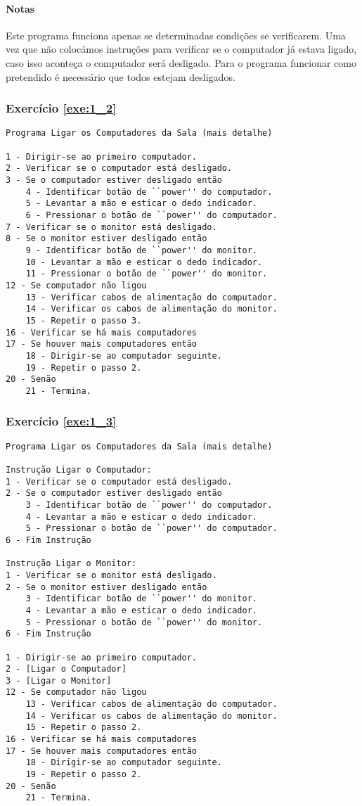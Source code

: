 \paragraph{Notas}
Este programa funciona apenas se determinadas condições se verificarem. Uma vez que 
não colocámos instruções para verificar se o computador já estava ligado, caso
isso aconteça o computador será desligado. Para o programa funcionar como
pretendido é necessário que todos estejam desligados.


\subsubsection*{Exercício \ref{exe:1_2}}
{\footnotesize
\begin{verbatim}
Programa Ligar os Computadores da Sala (mais detalhe)

1 - Dirigir-se ao primeiro computador.
2 - Verificar se o computador está desligado.
3 - Se o computador estiver desligado então
    4 - Identificar botão de ``power'' do computador.
    5 - Levantar a mão e esticar o dedo indicador.
    6 - Pressionar o botão de ``power'' do computador.
7 - Verificar se o monitor está desligado.
8 - Se o monitor estiver desligado então
    9 - Identificar botão de ``power'' do monitor.
    10 - Levantar a mão e esticar o dedo indicador.
    11 - Pressionar o botão de ``power'' do monitor.
12 - Se computador não ligou
    13 - Verificar cabos de alimentação do computador.
    14 - Verificar os cabos de alimentação do monitor.
    15 - Repetir o passo 3.
16 - Verificar se há mais computadores     
17 - Se houver mais computadores então
    18 - Dirigir-se ao computador seguinte.
    19 - Repetir o passo 2.
20 - Senão
    21 - Termina.    
\end{verbatim}}

\subsubsection*{Exercício \ref{exe:1_3}}
{\footnotesize
\begin{verbatim}
Programa Ligar os Computadores da Sala (mais detalhe)

Instrução Ligar o Computador:
1 - Verificar se o computador está desligado.
2 - Se o computador estiver desligado então
    3 - Identificar botão de ``power'' do computador.
    4 - Levantar a mão e esticar o dedo indicador.
    5 - Pressionar o botão de ``power'' do computador.
6 - Fim Instrução    

Instrução Ligar o Monitor:
1 - Verificar se o monitor está desligado.
2 - Se o monitor estiver desligado então
    3 - Identificar botão de ``power'' do monitor.
    4 - Levantar a mão e esticar o dedo indicador.
    5 - Pressionar o botão de ``power'' do monitor.
6 - Fim Instrução

1 - Dirigir-se ao primeiro computador.
2 - [Ligar o Computador]
3 - [Ligar o Monitor]
12 - Se computador não ligou
    13 - Verificar cabos de alimentação do computador.
    14 - Verificar os cabos de alimentação do monitor.
    15 - Repetir o passo 2.
16 - Verificar se há mais computadores     
17 - Se houver mais computadores então
    18 - Dirigir-se ao computador seguinte.
    19 - Repetir o passo 2.
20 - Senão
    21 - Termina.
\end{verbatim}}